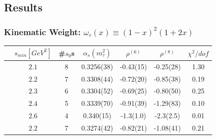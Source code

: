 \documentclass{beamer}
\begin{document}
\subsection{Results}
\begin{frame}
  \frametitle{Kinematic Weight: \(\omega_\tau(x) \equiv (1-x)^2(1+2x)\)}
  \centering
  \begin{tabular}{ccccccc}
    \toprule
    & \(s_{min} [GeV^2]\) & \#\(s_0\)s & \(\alpha_s(m_\tau^2)\) & \(\rho^{(6)}\) & \(\rho^{(8)}\) & \(\chi^2/dof\)  \\
    \midrule
    \parbox[t]{2mm}{}
    & \(2.1\) & 8 & 0.3256(38) & -0.43(15) & -0.25(28) & 1.30 \\
    & \(2.2\) & 7 & 0.3308(44) & -0.72(20) & -0.85(38) & 0.19 \\
    & \(2.3\) & 6 & 0.3304(52) & -0.69(25) & -0.80(50) & 0.25 \\
    & \(2.4\) & 5 & 0.3339(70) & -0.91(39) & -1.29(83) & 0.10 \\
    & \(2.6\) & 4 & 0.340(15) & -1.3(1.0) & -2.3(2.5) & 0.01  \\
    \midrule
    \parbox[t]{2mm}{}
    & \(2.2\) & 7 & 0.3274(42) & -0.82(21) & -1.08(41) & 0.21 \\
    \bottomrule
  \end{tabular}
\end{frame}
\end{document}
